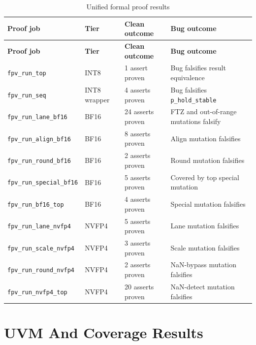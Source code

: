 \documentclass[11pt,oneside]{report}
\begin{document}
\begin{longtable}{p{}p{}p{}p{}}
\caption{Unified formal proof results}\\
\toprule
\textbf{Proof job} & \textbf{Tier} & \textbf{Clean outcome} & \textbf{Bug outcome} \\
\midrule
\endfirsthead
\toprule
\textbf{Proof job} & \textbf{Tier} & \textbf{Clean outcome} & \textbf{Bug outcome} \\
\midrule
\endhead
\texttt{fpv\_run\_top} & INT8 & 1 assert proven & Bug falsifies result equivalence \\
\texttt{fpv\_run\_seq} & INT8 wrapper & 4 asserts proven & Bug falsifies \texttt{p\_hold\_stable} \\
\texttt{fpv\_run\_lane\_bf16} & BF16 & 24 asserts proven & FTZ and out-of-range mutations falsify \\
\texttt{fpv\_run\_align\_bf16} & BF16 & 8 asserts proven & Align mutation falsifies \\
\texttt{fpv\_run\_round\_bf16} & BF16 & 2 asserts proven & Round mutation falsifies \\
\texttt{fpv\_run\_special\_bf16} & BF16 & 5 asserts proven & Covered by top special mutation \\
\texttt{fpv\_run\_bf16\_top} & BF16 & 4 asserts proven & Special mutation falsifies \\
\texttt{fpv\_run\_lane\_nvfp4} & NVFP4 & 5 asserts proven & Lane mutation falsifies \\
\texttt{fpv\_run\_scale\_nvfp4} & NVFP4 & 3 asserts proven & Scale mutation falsifies \\
\texttt{fpv\_run\_round\_nvfp4} & NVFP4 & 2 asserts proven & NaN-bypass mutation falsifies \\
\texttt{fpv\_run\_nvfp4\_top} & NVFP4 & 20 asserts proven & NaN-detect mutation falsifies \\
\bottomrule
\end{longtable}

\section{UVM And Coverage Results}
\end{document}
